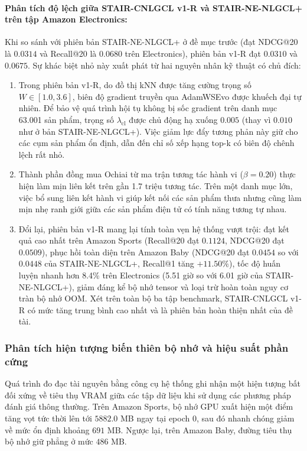 \paragraph{Phân tích độ lệch giữa STAIR-CNLGCL v1-R và STAIR-NE-NLGCL+ trên tập Amazon Electronics:}
Khi so sánh với phiên bản STAIR-NE-NLGCL+ ở đề mục trước (đạt NDCG@20 là $0.0314$ và Recall@20 là $0.0680$ trên Electronics), phiên bản v1-R đạt $0.0310$ và $0.0675$. Sự khác biệt nhỏ này xuất phát từ hai nguyên nhân kỹ thuật có chủ đích:
\begin{enumerate}[leftmargin=*]
    \item Trong phiên bản v1-R, do đồ thị kNN được tăng cường trọng số $W \in [1.0, 3.6]$, biên độ gradient truyền qua AdamWSEvo được khuếch đại tự nhiên. Để bảo vệ quá trình hội tụ không bị sốc gradient trên danh mục 63.001 sản phẩm, trọng số $\lambda_{\text{cl}}$ được chủ động hạ xuống $0.005$ (thay vì $0.010$ như ở bản STAIR-NE-NLGCL+). Việc giảm lực đẩy tương phản này giữ cho các cụm sản phẩm ổn định, dẫn đến chỉ số xếp hạng top-k có biên độ chênh lệch rất nhỏ.
    \item Thành phần đồng mua Ochiai từ ma trận tương tác hành vi ($\beta = 0.20$) thực hiện làm mịn liên kết trên gần 1.7 triệu tương tác. Trên một danh mục lớn, việc bổ sung liên kết hành vi giúp kết nối các sản phẩm thưa nhưng cũng làm mịn nhẹ ranh giới giữa các sản phẩm điện tử có tính năng tương tự nhau.
    \item Đổi lại, phiên bản v1-R mang lại tính toàn vẹn hệ thống vượt trội: đạt kết quả cao nhất trên Amazon Sports (Recall@20 đạt $0.1124$, NDCG@20 đạt $0.0509$), phục hồi toàn diện trên Amazon Baby (NDCG@20 đạt $0.0454$ so với $0.0448$ của STAIR-NE-NLGCL+, Recall@1 tăng $+11.50\%$), tốc độ huấn luyện nhanh hơn 8.4\% trên Electronics (5.51 giờ so với 6.01 giờ của STAIR-NE-NLGCL+), giảm đáng kể bộ nhớ tensor và loại trừ hoàn toàn nguy cơ tràn bộ nhớ OOM. Xét trên toàn bộ ba tập benchmark, STAIR-CNLGCL v1-R có mức tăng trung bình cao nhất và là phiên bản hoàn thiện nhất của đề tài.
\end{enumerate}

\subsubsection{Phân tích hiện tượng biến thiên bộ nhớ và hiệu suất phần cứng}

Quá trình đo đạc tài nguyên bằng công cụ hệ thống ghi nhận một hiện tượng bất đối xứng về tiêu thụ VRAM giữa các tập dữ liệu khi sử dụng các phương pháp đánh giá thông thường. Trên Amazon Sports, bộ nhớ GPU xuất hiện một điểm tăng vọt tức thời lên tới $5882.0$ MB ngay tại epoch 0, sau đó nhanh chóng giảm về mức ổn định khoảng $691$ MB. Ngược lại, trên Amazon Baby, đường tiêu thụ bộ nhớ giữ phẳng ở mức $486$ MB.

